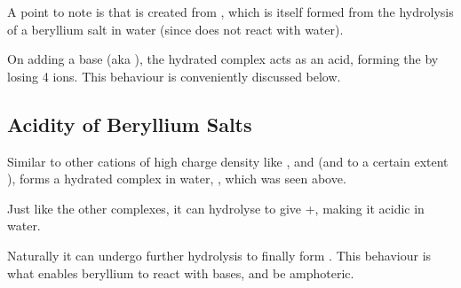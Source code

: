 
				A point to note is that  is created from , which is itself formed
				from the hydrolysis of a beryllium salt in water (since  does not react with water).

				On adding a base (aka ), the hydrated  complex acts as an acid,
				forming the  by losing 4  ions. This behaviour is conveniently
				discussed below.



		\subsection{Acidity of Beryllium Salts}

			Similar to other cations of high charge density like ,  and  (and to
			a certain extent ),  forms a hydrated complex in water, ,
			which was seen above.

			Just like the other complexes, it can hydrolyse to give +, making it acidic in water.


			Naturally it can undergo further hydrolysis to finally form . This behaviour
			is what enables beryllium to react with bases, and be amphoteric.































